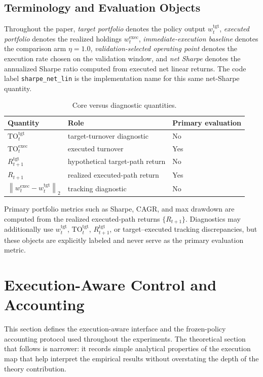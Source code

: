 \documentclass[10pt,twocolumn]{article}
\newcommand{\wexec}{w^{\mathrm{exec}}}
\newcommand{\wtgt}{w^{\mathrm{tgt}}}
\newcommand{\TOexec}{\mathrm{TO}^{\mathrm{exec}}}
\newcommand{\TOtgt}{\mathrm{TO}^{\mathrm{tgt}}}
\newcommand{\normtwo}[1]{\left\lVert #1 \right\rVert_2}
\begin{document}
\subsection{Terminology and Evaluation Objects}
Throughout the paper, \emph{target portfolio} denotes the policy output $\wtgt_t$, \emph{executed portfolio} denotes the realized holdings $\wexec_t$, \emph{immediate-execution baseline} denotes the comparison arm $\eta=1.0$, \emph{validation-selected operating point} denotes the execution rate chosen on the validation window, and \emph{net Sharpe} denotes the annualized Sharpe ratio computed from executed net linear returns. The code label \texttt{sharpe\_net\_lin} is the implementation name for this same net-Sharpe quantity.

\begin{table}[H]
\centering
\scriptsize
\caption{Core versus diagnostic quantities.}
\label{tab:core_vs_diag}
\begin{tabular}{@{}lll@{}}
\toprule
Quantity & Role & Primary evaluation \\
\midrule
$\TOtgt_t$ & target-turnover diagnostic & No \\
$\TOexec_t$ & executed turnover & Yes \\
$R^{\mathrm{tgt}}_{t+1}$ & hypothetical target-path return & No \\
$R_{t+1}$ & realized executed-path return & Yes \\
$\normtwo{\wexec_t-\wtgt_t}$ & tracking diagnostic & No \\
\bottomrule
\end{tabular}
\end{table}

Primary portfolio metrics such as Sharpe, CAGR, and max drawdown are computed from the realized executed-path returns $\{R_{t+1}\}$. Diagnostics may additionally use $\wtgt_t$, $\TOtgt_t$, $R^{\mathrm{tgt}}_{t+1}$, or target--executed tracking discrepancies, but these objects are explicitly labeled and never serve as the primary evaluation metric.

\section{Execution-Aware Control and Accounting}
This section defines the execution-aware interface and the frozen-policy accounting protocol used throughout the experiments. The theoretical section that follows is narrower: it records simple analytical properties of the execution map that help interpret the empirical results without overstating the depth of the theory contribution.
\end{document}
